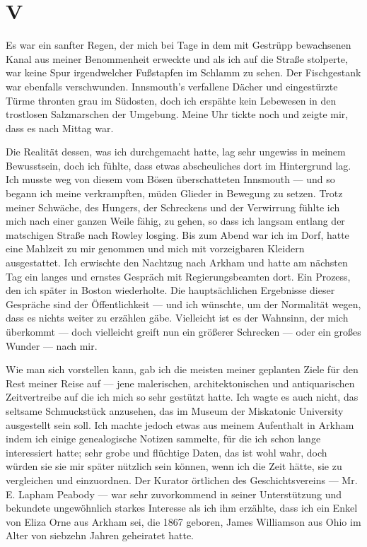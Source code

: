 \chapter*{V}

Es war ein sanfter Regen, der mich bei Tage in dem mit Gestrüpp bewachsenen Kanal aus meiner Benommenheit erweckte und als ich auf die Straße stolperte, war keine Spur irgendwelcher Fußstapfen im Schlamm zu sehen. Der Fischgestank war ebenfalls verschwunden. Innsmouth's verfallene Dächer und eingestürzte Türme thronten grau im Südosten, doch ich erspähte kein Lebewesen in den trostlosen Salzmarschen der Umgebung. Meine Uhr tickte noch und zeigte mir, dass es nach Mittag war.

Die Realität dessen, was ich durchgemacht hatte, lag sehr ungewiss in meinem Bewusstsein, doch ich fühlte, dass etwas abscheuliches dort im Hintergrund lag. Ich musste weg von diesem vom Bösen überschatteten Innsmouth --- und so begann ich meine verkrampften, müden Glieder in Bewegung zu setzen. Trotz meiner Schwäche, des Hungers, der Schreckens und der Verwirrung fühlte ich mich nach einer ganzen Weile fähig, zu gehen, so dass ich langsam entlang der matschigen Straße nach Rowley losging. Bis zum Abend war ich im Dorf, hatte eine Mahlzeit zu mir genommen und mich mit vorzeigbaren Kleidern ausgestattet. Ich erwischte den Nachtzug nach Arkham und hatte am nächsten Tag ein langes und ernstes Gespräch mit Regierungsbeamten dort. Ein Prozess, den ich später in Boston wiederholte. Die hauptsächlichen Ergebnisse dieser Gespräche sind der Öffentlichkeit --- und ich wünschte, um der Normalität wegen, dass es nichts weiter zu erzählen gäbe. Vielleicht ist es der Wahnsinn, der mich überkommt --- doch vielleicht greift nun ein größerer Schrecken --- oder ein großes Wunder --- nach mir.

Wie man sich vorstellen kann, gab ich die meisten meiner geplanten Ziele für den Rest meiner Reise auf --- jene malerischen, architektonischen und antiquarischen Zeitvertreibe auf die ich mich so sehr gestützt hatte. Ich wagte es auch nicht, das seltsame Schmuckstück anzusehen, das im Museum der Miskatonic University ausgestellt sein soll. Ich machte jedoch etwas aus meinem Aufenthalt in Arkham indem ich einige genealogische Notizen sammelte, für die ich schon lange interessiert hatte; sehr grobe und flüchtige Daten, das ist wohl wahr, doch würden sie sie mir später nützlich sein können, wenn ich die Zeit hätte, sie zu vergleichen und einzuordnen. Der Kurator örtlichen des Geschichtsvereins --- Mr. E. Lapham Peabody --- war sehr zuvorkommend in seiner Unterstützung und bekundete ungewöhnlich starkes Interesse als ich ihm erzählte, dass ich ein Enkel von Eliza Orne aus Arkham sei, die 1867 geboren, James Williamson aus Ohio im Alter von siebzehn Jahren geheiratet hatte.

